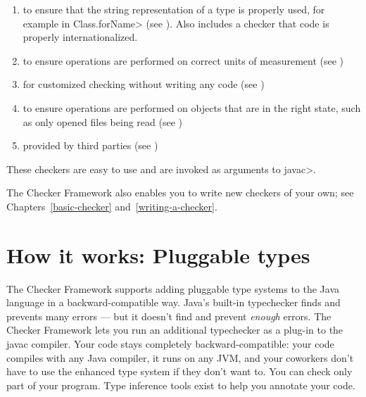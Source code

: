 \begin{enumerate}
\item
   to ensure that the
  string representation of a type is properly used, for example in
  \<Class.forName> (see ).
  Also includes a checker that code is properly internationalized.
\item
   to ensure operations are
  performed on correct units of measurement
  (see )
\item
   for customized checking without
  writing any code (see )
\item
   to ensure operations are
  performed on objects that are in the right state, such as only opened
  files being read (see )
\item
   provided by third
  parties (see )

\end{enumerate}

\noindent
These checkers are easy to use and are invoked as arguments to \<javac>.


The Checker Framework also enables you to write new checkers of your
own; see Chapters~\ref{basic-checker} and~\ref{writing-a-checker}.


\section{How it works:  Pluggable types\label{pluggable-types}}

The Checker Framework supports adding
pluggable type systems to the Java language in a backward-compatible way.
Java's built-in typechecker finds and prevents many errors --- but it
doesn't find and prevent \emph{enough} errors.  The Checker Framework lets you
run an additional typechecker as a plug-in to the javac compiler.  Your
code stays completely backward-compatible:  your code compiles with any
Java compiler, it runs on any JVM, and your coworkers don't have to use the
enhanced type system if they don't want to.  You can check only part of
your program.  Type inference tools exist to help you annotate your
code.


